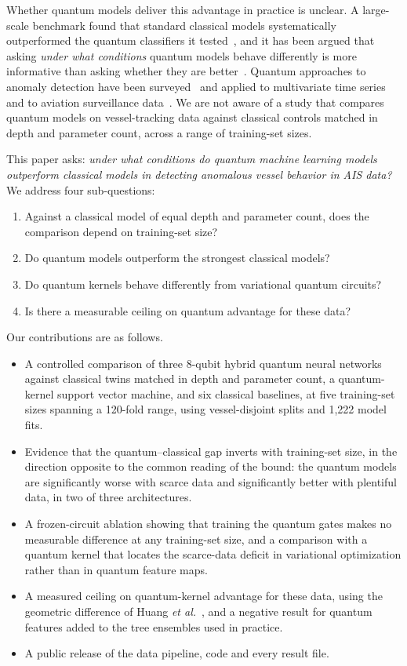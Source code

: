 \documentclass[journal]{IEEEtran}
\begin{document}
Whether quantum models deliver this advantage in practice is unclear. A
large-scale benchmark found that standard classical models systematically
outperformed the quantum classifiers it tested~\cite{bowles2024benchmarking},
and it has been argued that asking \emph{under what conditions} quantum models
behave differently is more informative than asking whether they are
better~\cite{schuld2022advantage}. Quantum approaches to anomaly detection have
been surveyed~\cite{corli2025anomaly} and applied to multivariate time series
and to aviation surveillance data~\cite{tscharke2025autoencoder,naaman2025adsb}.
We are not aware of a study that compares quantum models on vessel-tracking data
against classical controls matched in depth and parameter count, across a range
of training-set sizes.

This paper asks: \emph{under what conditions do quantum machine learning models
outperform classical models in detecting anomalous vessel behavior in AIS data?}
We address four sub-questions:
\begin{enumerate}[\IEEEsetlabelwidth{(SQ4)}]
  \item[(SQ1)] Against a classical model of equal depth and parameter count,
  does the comparison depend on training-set size?
  \item[(SQ2)] Do quantum models outperform the strongest classical models?
  \item[(SQ3)] Do quantum kernels behave differently from variational quantum
  circuits?
  \item[(SQ4)] Is there a measurable ceiling on quantum advantage for these data?
\end{enumerate}

Our contributions are as follows.
\begin{itemize}
  \item A controlled comparison of three 8-qubit hybrid quantum neural networks
  against classical twins matched in depth and parameter count, a quantum-kernel
  support vector machine, and six classical baselines, at five training-set
  sizes spanning a 120-fold range, using vessel-disjoint splits and 1,222 model
  fits.
  \item Evidence that the quantum--classical gap inverts with training-set size,
  in the direction opposite to the common reading of the bound: the quantum
  models are significantly worse with scarce data and significantly better with
  plentiful data, in two of three architectures.
  \item A frozen-circuit ablation showing that training the quantum gates makes
  no measurable difference at any training-set size, and a comparison with a
  quantum kernel that locates the scarce-data deficit in variational
  optimization rather than in quantum feature maps.
  \item A measured ceiling on quantum-kernel advantage for these data, using the
  geometric difference of Huang \textit{et al.}~\cite{huang2021power}, and a
  negative result for quantum features added to the tree ensembles used in
  practice.
  \item A public release of the data pipeline, code and every result file.
\end{itemize}
\end{document}
